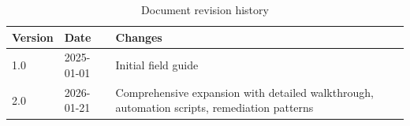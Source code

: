 \documentclass[11pt,letterpaper]{article}
\begin{document}
\begin{table}[htbp]
\centering
\begin{tabular}{@{}llp{8cm}@{}}
\toprule
\textbf{Version} & \textbf{Date} & \textbf{Changes} \\
\midrule
1.0 & 2025-01-01 & Initial field guide \\
2.0 & 2026-01-21 & Comprehensive expansion with detailed walkthrough, automation scripts, remediation patterns \\
\bottomrule
\end{tabular}
\caption{Document revision history}
\end{table}
\end{document}
